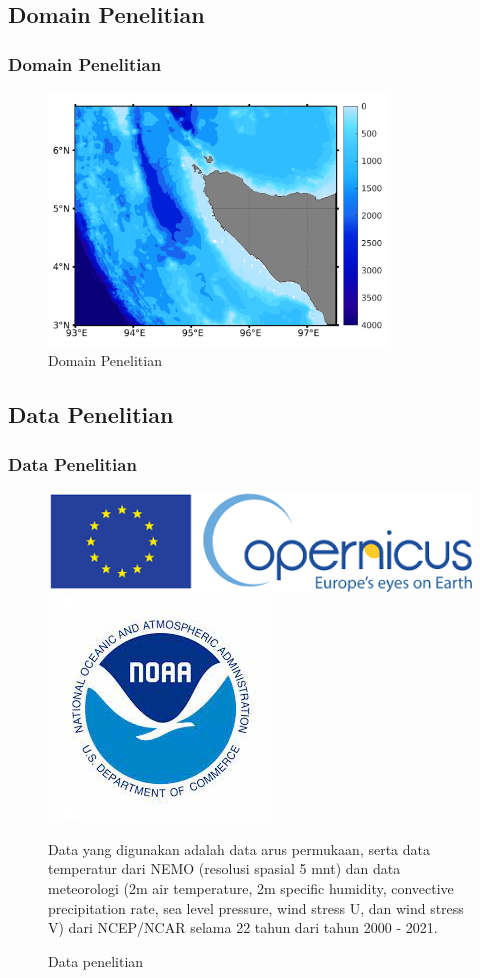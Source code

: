 \documentclass{beamer}
\begin{document}
\subsection{Domain Penelitian}
\begin{frame}
	\frametitle{Domain Penelitian}
	\begin{figure}[H]
		\centering
		\includegraphics[width=9cm]{bathymetri}
		\caption{Domain Penelitian}
		\label{fig:domain}
	\end{figure}
\end{frame}

\subsection{Data Penelitian}
\begin{frame}
	\frametitle{Data Penelitian}
	\begin{figure}[H]
		\centering
		\includegraphics[width=.5\textwidth]{logo_cmmes.png}
		\\[\smallskipamount]
		\includegraphics[width=.24\textwidth]{logo_ncep.jpeg}
		\caption{Data penelitian}
		\label{fig:data}
		\tiny
		Data yang digunakan adalah data arus permukaan, serta data temperatur dari NEMO (resolusi spasial 5 mnt) dan data meteorologi (2m air temperature, 2m specific
		humidity, convective precipitation rate, sea level pressure, wind stress U, dan wind
		stress V) dari NCEP/NCAR selama 22 tahun dari tahun 2000 - 2021. 
	\end{figure}
\end{frame}
\end{document}
